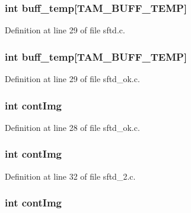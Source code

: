 \hypertarget{group__SFTD_gaf04e37b7953920f8142c8ebf2b9f7d13}{
\subsubsection[{buff\_\-temp}]{\setlength{\rightskip}{0pt plus 5cm}int {\bf buff\_\-temp}\mbox{[}TAM\_\-BUFF\_\-TEMP\mbox{]}}}
\label{group__SFTD_gaf04e37b7953920f8142c8ebf2b9f7d13}


Definition at line 29 of file sftd.c.

\hypertarget{group__SFTD_gaf04e37b7953920f8142c8ebf2b9f7d13}{
\subsubsection[{buff\_\-temp}]{\setlength{\rightskip}{0pt plus 5cm}int {\bf buff\_\-temp}\mbox{[}TAM\_\-BUFF\_\-TEMP\mbox{]}}}
\label{group__SFTD_gaf04e37b7953920f8142c8ebf2b9f7d13}


Definition at line 29 of file sftd\_\-ok.c.

\hypertarget{group__SFTD_ga46b780fcc31527f9e6b9b94b27c5fdc9}{
\subsubsection[{contImg}]{\setlength{\rightskip}{0pt plus 5cm}int {\bf contImg}}}
\label{group__SFTD_ga46b780fcc31527f9e6b9b94b27c5fdc9}


Definition at line 28 of file sftd\_\-ok.c.

\hypertarget{group__SFTD_ga46b780fcc31527f9e6b9b94b27c5fdc9}{
\subsubsection[{contImg}]{\setlength{\rightskip}{0pt plus 5cm}int {\bf contImg}}}
\label{group__SFTD_ga46b780fcc31527f9e6b9b94b27c5fdc9}


Definition at line 32 of file sftd\_\-2.c.

\hypertarget{group__SFTD_ga46b780fcc31527f9e6b9b94b27c5fdc9}{
\subsubsection[{contImg}]{\setlength{\rightskip}{0pt plus 5cm}int {\bf contImg}}}
\label{group__SFTD_ga46b780fcc31527f9e6b9b94b27c5fdc9}


